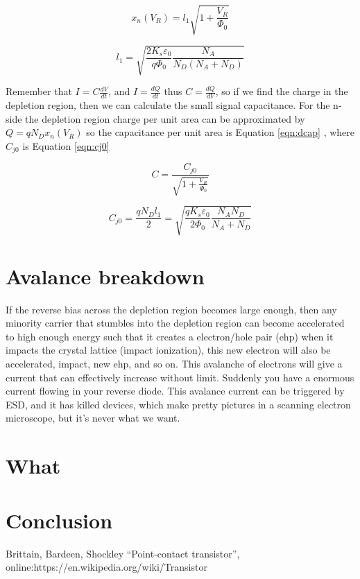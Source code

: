 \documentclass[technote,10pt,a4paper]{IEEEtran}
\newcommand{\req}[1]{Equation \ref{eqn:#1} }
\newcommand{\eqnr}[2]{
  \begin{equation}
    #1
    \label{eqn:#2}
  \end{equation}}
\begin{document}
\eqnr{ x_n(V_R) = l_1 \sqrt{1 + \frac{V_R}{\Phi_0}} }{width}

\eqnr{ l_1 = \sqrt{\frac{2K_s\varepsilon_0}{q\Phi_0}\frac{N_A}{N_D(N_A +
      N_D)}} }{l1}

Remember that $I = C \frac{dV}{dt}$, and $I = \frac{dQ}{dt}$ thus $ C= \frac{dQ}{dV}$, so if we find the charge in the
depletion region, then we can calculate the small signal capacitance. For the
n-side the depletion region
charge per unit area can be approximated by $Q = qN_D x_n(V_R)$ so the
capacitance per unit area is \req{dcap}, where $C_{j0}$ is \req{cj0}
\eqnr{ C = \frac{C_{j0}}{\sqrt{1 + \frac{V_R}{\Phi_0} } }}{dcap}
\eqnr{ C_{j0} = \frac{qN_D l_1}{2} =
  \sqrt{\frac{qK_s\varepsilon_0}{2\Phi_0}\frac{N_A N_D}{N_A +
      N_D}} }{cj0}

\section{Avalance breakdown}
If the reverse bias across the depletion region becomes large enough, then any
minority carrier that stumbles into the depletion region can become
accelerated to high enough energy such that it creates a electron/hole pair (ehp) when
it impacts the crystal lattice (impact ionization), this new electron will also
be accelerated, impact, new ehp, and so on. This avalanche of electrons will
give a current that can effectively increase without limit. Suddenly you have a
enormous current flowing in your reverse diode. This avalance current can be triggered
by ESD, and it has killed devices, which make pretty pictures in a scanning
electron microscope, but it's never what we want.



\section{What}

\section{Conclusion}



\begin{thebibliography}{1}
  \providecommand{\url}[1]{#1}

  Brittain, Bardeen, Shockley ``Point-contact transistor'', online:\url{https://en.wikipedia.org/wiki/Transistor}




\end{thebibliography}
\end{document}
